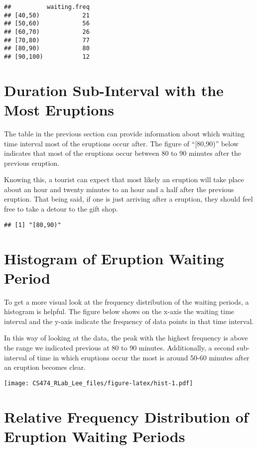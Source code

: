 \documentclass[
]{article}
\begin{document}
\begin{verbatim}
##          waiting.freq
## [40,50)            21
## [50,60)            56
## [60,70)            26
## [70,80)            77
## [80,90)            80
## [90,100)           12
\end{verbatim}

\hypertarget{duration-sub-interval-with-the-most-eruptions}{%
\section{Duration Sub-Interval with the Most
Eruptions}\label{duration-sub-interval-with-the-most-eruptions}}

The table in the previous section can provide information about which
waiting time interval most of the eruptions occur after. The figure of
``{[}80,90)'' below indicates that most of the eruptions occur between
80 to 90 minutes after the previous eruption.

Knowing this, a tourist can expect that most likely an eruption will
take place about an hour and twenty minutes to an hour and a half after
the previous eruption. That being said, if one is just arriving after a
eruption, they should feel free to take a detour to the gift shop.

\begin{verbatim}
## [1] "[80,90)"
\end{verbatim}

\hypertarget{histogram-of-eruption-waiting-period}{%
\section{Histogram of Eruption Waiting
Period}\label{histogram-of-eruption-waiting-period}}

To get a more visual look at the frequency distribution of the waiting
periods, a histogram is helpful. The figure below shows on the x-axis
the waiting time interval and the y-axis indicate the frequency of data
points in that time interval.

In this way of looking at the data, the peak with the highest frequency
is above the range we indicated previous at 80 to 90 minutes.
Additionally, a second sub-interval of time in which eruptions occur the
most is around 50-60 minutes after an eruption becomes clear.

\texttt{[image: CS474\_RLab\_Lee\_files/figure-latex/hist-1.pdf]}

\hypertarget{relative-frequency-distribution-of-eruption-waiting-periods}{%
\section{Relative Frequency Distribution of Eruption Waiting
Periods}\label{relative-frequency-distribution-of-eruption-waiting-periods}}
\end{document}
